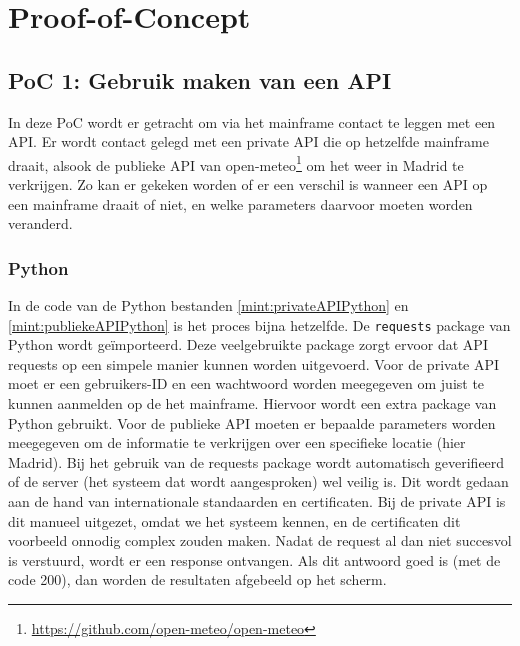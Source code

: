 \chapter{Proof-of-Concept}%
\label{ch:Proof-of-Concept}

\section{PoC 1: Gebruik maken van  een API}
In deze PoC wordt er getracht om via het mainframe contact te leggen met een API. Er wordt contact gelegd met een private API die op hetzelfde mainframe draait, alsook de publieke API van open-meteo\footnote{\url{https://github.com/open-meteo/open-meteo}\label{fn:openmeteorepo}} om het weer in Madrid te verkrijgen. Zo kan er gekeken worden of er een verschil is wanneer een API op een mainframe draait of niet, en welke parameters daarvoor moeten worden veranderd.

\subsection{Python}
In de code van de Python bestanden \ref{mint:privateAPIPython} en \ref{mint:publiekeAPIPython} is het proces bijna hetzelfde. De \texttt{requests} package van Python wordt geïmporteerd. Deze veelgebruikte package zorgt ervoor dat API requests op een simpele manier kunnen worden uitgevoerd. Voor de private API moet er een gebruikers-ID en een wachtwoord worden meegegeven om juist te kunnen aanmelden op de het mainframe. Hiervoor wordt een extra package van Python gebruikt. Voor de publieke API moeten er bepaalde parameters worden meegegeven om de informatie te verkrijgen over een specifieke locatie (hier Madrid). Bij het gebruik van de requests package wordt automatisch geverifieerd of de server (het systeem dat wordt aangesproken) wel veilig is. Dit wordt gedaan aan de hand van internationale standaarden en certificaten. Bij de private API is dit manueel uitgezet, omdat we het systeem kennen, en de certificaten dit voorbeeld onnodig complex zouden maken. Nadat de request al dan niet succesvol is verstuurd, wordt er een response ontvangen. Als dit antwoord goed is (met de code 200), dan worden de resultaten afgebeeld op het scherm.


